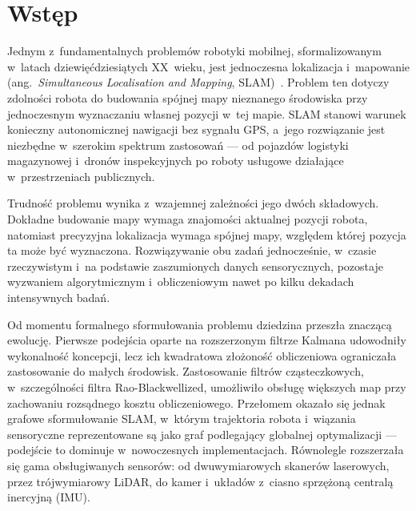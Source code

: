 


\chapter{Wstęp}

Jednym z~fundamentalnych problemów robotyki mobilnej, sformalizowanym w~latach
dziewięćdziesiątych XX~wieku, jest jednoczesna lokalizacja i~mapowanie
(ang.~\textit{Simultaneous Localisation and Mapping}, SLAM)~\cite{leonard1991mobile}.
Problem ten dotyczy zdolności robota do budowania spójnej mapy nieznanego środowiska
przy jednoczesnym wyznaczaniu własnej pozycji w~tej mapie.
SLAM stanowi warunek konieczny autonomicznej nawigacji bez sygnału GPS,
a~jego rozwiązanie jest niezbędne w~szerokim spektrum zastosowań ---
od pojazdów logistyki magazynowej i~dronów inspekcyjnych po roboty usługowe
działające w~przestrzeniach publicznych.

Trudność problemu wynika z~wzajemnej zależności jego dwóch składowych.
Dokładne budowanie mapy wymaga znajomości aktualnej pozycji robota,
natomiast precyzyjna lokalizacja wymaga spójnej mapy, względem której
pozycja ta może być wyznaczona.
Rozwiązywanie obu zadań jednocześnie, w~czasie rzeczywistym i~na podstawie
zaszumionych danych sensorycznych, pozostaje wyzwaniem algorytmicznym
i~obliczeniowym nawet po kilku dekadach intensywnych badań.

Od momentu formalnego sformułowania problemu dziedzina przeszła znaczącą ewolucję.
Pierwsze podejścia oparte na rozszerzonym filtrze Kalmana udowodniły
wykonalność koncepcji, lecz ich kwadratowa złożoność obliczeniowa ograniczała
zastosowanie do małych środowisk.
Zastosowanie filtrów cząsteczkowych, w~szczególności filtra Rao-Blackwellized,
umożliwiło obsługę większych map przy zachowaniu rozsądnego kosztu obliczeniowego.
Przełomem okazało się jednak grafowe sformułowanie SLAM, w~którym trajektoria
robota i~wiązania sensoryczne reprezentowane są jako graf podlegający globalnej
optymalizacji --- podejście to dominuje w~nowoczesnych implementacjach.
Równolegle rozszerzała się gama obsługiwanych sensorów: od dwuwymiarowych
skanerów laserowych, przez trójwymiarowy LiDAR, do kamer i~układów z~ciasno
sprzężoną centralą inercyjną (IMU).

